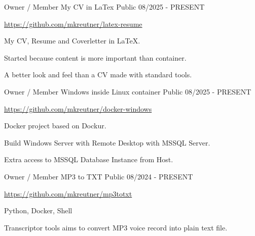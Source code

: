 

\begin{cventries}

  \cventry
    {Owner / Member} %
    {My CV in LaTex} %
    {Public} %
    {08/2025 - PRESENT} %
    {
      \url{https://github.com/mkreutner/latex-resume}
      \newline \vspace{12pt}
      \begin{cvitems} %
        \item {My CV, Resume and Coverletter in LaTeX.}
        \item {Started because content is more important than container.}
        \item {A better look and feel than a CV made with standard tools.}
      \end{cvitems}
    }

  \cventry
    {Owner / Member} %
    {Windows inside Linux container} %
    {Public} %
    {08/2025 - PRESENT} %
    {
      \url{https://github.com/mkreutner/docker-windows}
      \newline \vspace{12pt}
      \begin{cvitems} %
        \item {Docker project based on Dockur.}
        \item {Build Windows Server with Remote Desktop with MSSQL Server.}
        \item {Extra access to MSSQL Database Instance from Host.}
      \end{cvitems}
    }

  \cventry
    {Owner / Member} %
    {MP3 to TXT} %
    {Public} %
    {08/2024 - PRESENT} %
    {
      \url{https://github.com/mkreutner/mp3totxt}
      \newline \vspace{12pt}
      \begin{cvitems} %
        \item {Python, Docker, Shell}
        \item {Transcriptor tools aims to convert MP3 voice record into plain text file.}
      \end{cvitems}
    }

\end{cventries}
